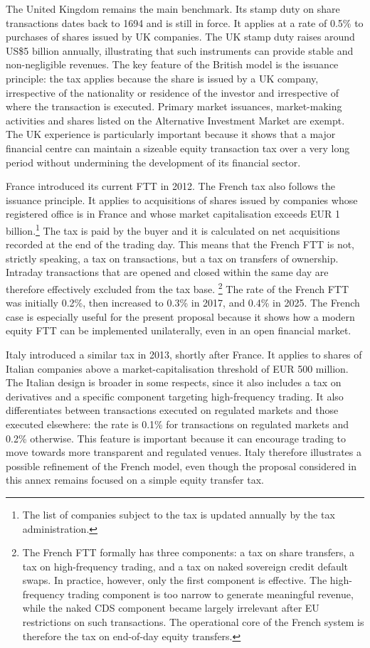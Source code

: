 \documentclass[../main]{subfiles}
\begin{document}
The United Kingdom remains the main benchmark. Its stamp duty on share transactions dates back to 1694 and is still in force. It applies at a rate of 0.5\% to purchases of shares issued by UK companies. The UK stamp duty raises around US\$5 billion annually, illustrating that such instruments can provide stable and non-negligible revenues. The key feature of the British model is the issuance principle: the tax applies because the share is issued by a UK company, irrespective of the nationality or residence of the investor and irrespective of where the transaction is executed. Primary market issuances, market-making activities and shares listed on the Alternative Investment Market are exempt. The UK experience is particularly important because it shows that a major financial centre can maintain a sizeable equity transaction tax over a very long period without undermining the development of its financial sector.

France introduced its current FTT in 2012. The French tax also follows the issuance principle. It applies to acquisitions of shares issued by companies whose registered office is in France and whose market capitalisation exceeds EUR 1 billion.\footnote{The list of companies subject to the tax is updated annually by the tax administration.} The tax is paid by the buyer  and it is calculated on net acquisitions recorded at the end of the trading day. This means that the French FTT is not, strictly speaking, a tax on transactions, but a tax on transfers of ownership. Intraday transactions that are opened and closed within the same day are therefore effectively excluded from the tax base.
\footnote{The French FTT formally has three components: a tax on share transfers, a tax on high-frequency trading, and a tax on naked sovereign credit default swaps. In practice, however, only the first component is effective. The high-frequency trading component is too narrow to generate meaningful revenue, while the naked CDS component became largely irrelevant after EU restrictions on such transactions. The operational core of the French system is therefore the tax on end-of-day equity transfers.} The rate of the French FTT was initially 0.2\%, then increased to 0.3\% in 2017, and 0.4\% in 2025. The French case is especially useful for the present proposal because it shows how a modern equity FTT can be implemented unilaterally, even in an open financial market.

Italy introduced a similar tax in 2013, shortly after France. It applies to shares of Italian companies above a market-capitalisation threshold of EUR 500 million. The Italian design is broader in some respects, since it also includes a tax on derivatives and a specific component targeting high-frequency trading. It also differentiates between transactions executed on regulated markets and those executed elsewhere: the rate is 0.1\% for transactions on regulated markets and 0.2\% otherwise. This feature is important because it can encourage trading to move towards more transparent and regulated venues. Italy therefore illustrates a possible refinement of the French model, even though the proposal considered in this annex remains focused on a simple equity transfer tax.
\end{document}
